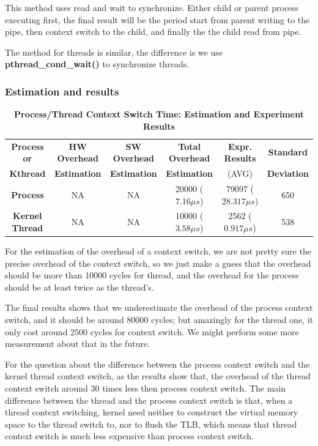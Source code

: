 This method uses read and wait to synchronize. Either child or parent process executing first, the final result will be the period start from parent writing to the pipe, then context switch to the child, and finally the the child read from pipe.

The method for threads is similar, the difference is we use \textbf{pthread\_cond\_wait()} to synchronize threads.


\subsubsection{Estimation and results}
\begin{table}[ht]
    \centering
    \caption{\textbf{Process/Thread Context Switch Time: Estimation and Experiment Results}}
    \hspace*{-2em}\begin{threeparttable}
        \begin{tabular}{cccccc}
        \hline
        \textbf{Process or} & \textbf{HW Overhead} & \textbf{SW Overhead } & \textbf{Total Overhead} & \textbf{Expr.        Results} & \textbf{Standard} \\
        \textbf{Kthread} & \textbf{Estimation}       &  \textbf{Estimation}         & \textbf{Estimation}  & (AVG)   & \textbf{Deviation}\\
        \hline
        \textbf{Process} & NA & NA & 20000 ($7.16 \mu s$) & 79097 ($28.317 \mu s$)  &  650\\
        \textbf{Kernel Thread} & NA & NA & 10000 ($3.58 \mu s$) & 2562 ($0.917 \mu s$) & 538\\
        \hline
        \end{tabular}
    \end{threeparttable}
    \label{context_switch_time}
\end{table}

For the estimation of the overhead of a context switch, we are not pretty sure the precise overhead of the context switch, so we just make a guess that the overhead should be more than 10000 cycles for thread, and the overhead for the process should be at least twice as the thread's.

The final results shows that we underestimate the overhead of the process context switch, and it should be around 80000 cycles; but amazingly for the thread one, it only cost around 2500 cycles for context switch. We might perform some more measurement about that in the future.

For the question about the difference between the process context switch and the kernel thread context switch, as the results show that, the overhead of the thread context switch around 30 times less then process context switch. The main difference between the thread and the process context switch
is that, when a thread context switching, kernel need neither to construct the virtual memory space to the thread switch to, nor to flush the TLB, which means that thread context switch is much less expensive than process context switch.
